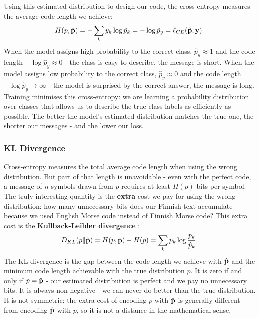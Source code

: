 Using this estimated distribution to design our code, the cross-entropy measures the average code length we achieve:
\begin{equation}
    H(p, \hat{\mathbf{p}}) = -\sum_k y_k \log \hat{p}_k = -\log \hat{p}_y = \ell_{CE}(\hat{\mathbf{p}}, \mathbf{y}).
\end{equation}
When the model assigns high probability to the correct class, $\hat{p}_y \approx 1$ and the code length $-\log \hat{p}_y \approx 0$ - the class is easy to describe, the message is short. When the model assigns low probability to the correct class, $\hat{p}_y \approx 0$ and the code length $-\log \hat{p}_y \to \infty$ - the model is surprised by the correct answer, the message is long. Training minimises this cross-entropy: we are learning a probability distribution over classes that allows us to describe the true class labels as efficiently as possible. The better the model's estimated distribution matches the true one, the shorter our messages - and the lower our loss.


\subsubsection{KL Divergence}

Cross-entropy measures the total average code length when using the wrong distribution. But part of that length is unavoidable - even with the perfect code, a message of $n$ symbols drawn from $p$ requires at least $H(p)$ bits per symbol. The truly interesting quantity is the \textbf{extra} cost we pay for using the wrong distribution: how many unnecessary bits does our Finnish text accumulate because we used English Morse code instead of Finnish Morse code? This extra cost is the \textbf{Kullback-Leibler divergence} \parencite{Kullback1951}:
\begin{equation}
    D_{KL}(p \| \hat{\mathbf{p}}) = H(p, \hat{\mathbf{p}}) - H(p) = \sum_k p_k \log \frac{p_k}{\hat{p}_k}.
\end{equation}
The KL divergence is the gap between the code length we achieve with $\hat{\mathbf{p}}$ and the minimum code length achievable with the true distribution $p$. It is zero if and only if $p = \hat{\mathbf{p}}$ - our estimated distribution is perfect and we pay no unnecessary bits. It is always non-negative - we can never do better than the true distribution. It is not symmetric: the extra cost of encoding $p$ with $\hat{\mathbf{p}}$ is generally different from encoding $\hat{\mathbf{p}}$ with $p$, so it is not a distance in the mathematical sense.

